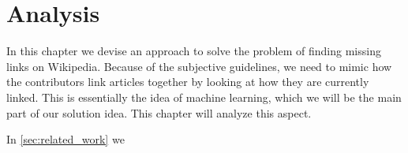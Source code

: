 \chapter{Analysis}\label{chap:analysis}
In this chapter we devise an approach to solve the problem of finding missing links on Wikipedia. 
Because of the subjective guidelines, we need to mimic how the contributors link articles together by looking at how they are currently linked. This is essentially the idea of machine learning, which we will be the main part of our solution idea. This chapter will analyze this aspect.

\begin{chapterorganization}
  \item In \cref{sec:related_work} we
 
\end{chapterorganization}







